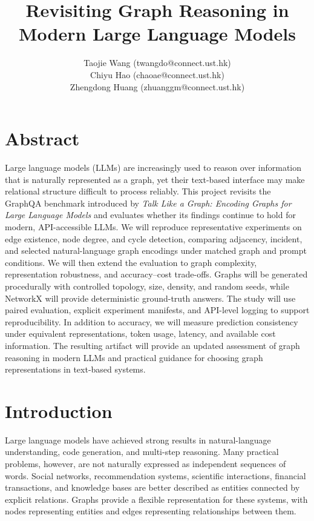 \documentclass[11pt,a4paper]{article}
\title{Revisiting Graph Reasoning in Modern Large Language Models}
\author{Taojie Wang (twangdo@connect.ust.hk)\\[0.35em] Chiyu Hao (chaoae@connect.ust.hk)\\[0.35em] Zhengdong Huang (zhuanggm@connect.ust.hk)}
\date{}
\begin{document}
\maketitle
\tableofcontents
\newpage
\section*{Abstract}
Large language models (LLMs) are increasingly used to reason over information that is naturally represented as a graph, yet their text-based interface may make relational structure difficult to process reliably. This project revisits the GraphQA benchmark introduced by \emph{Talk Like a Graph: Encoding Graphs for Large Language Models} and evaluates whether its findings continue to hold for modern, API-accessible LLMs. We will reproduce representative experiments on edge existence, node degree, and cycle detection, comparing adjacency, incident, and selected natural-language graph encodings under matched graph and prompt conditions. We will then extend the evaluation to graph complexity, representation robustness, and accuracy–cost trade-offs. Graphs will be generated procedurally with controlled topology, size, density, and random seeds, while NetworkX will provide deterministic ground-truth answers. The study will use paired evaluation, explicit experiment manifests, and API-level logging to support reproducibility. In addition to accuracy, we will measure prediction consistency under equivalent representations, token usage, latency, and available cost information. The resulting artifact will provide an updated assessment of graph reasoning in modern LLMs and practical guidance for choosing graph representations in text-based systems.

\section{Introduction}

Large language models have achieved strong results in natural-language understanding, code generation, and multi-step reasoning. Many practical problems, however, are not naturally expressed as independent sequences of words. Social networks, recommendation systems, scientific interactions, financial transactions, and knowledge bases are better described as entities connected by explicit relations. Graphs provide a flexible representation for these systems, with nodes representing entities and edges representing relationships between them.
\end{document}
